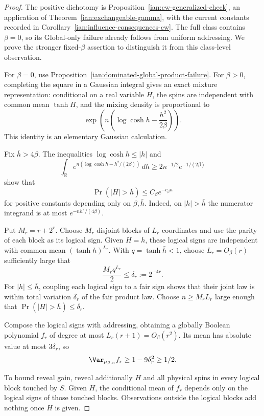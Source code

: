 \begin{proof}
The positive dichotomy is
Proposition~\ref{ian:cw-generalized-check}, an application of
Theorem~\ref{ian:exchangeable-gamma}, with the current constants
recorded in Corollary~\ref{ian:influence-consequences-cw}.
The full class contains \(\beta=0\), so its Global-only failure
already follows from uniform addressing. We prove the stronger
fixed-\(\beta\) assertion to distinguish it from this class-level
observation.

For \(\beta=0\), use
Proposition~\ref{ian:dominated-global-product-failure}.
For \(\beta>0\), completing the square in a Gaussian integral gives
an exact mixture representation: conditional on a real variable
\(H\), the spins are independent with common mean \(\tanh H\), and
the mixing density is proportional to
\[
 \exp\left(n\left(\log\cosh h-\frac{h^2}{2\beta}\right)\right).
\]
This identity is an elementary Gaussian calculation.

Fix \(\bar h>4\beta\). The inequalities
\(\log\cosh h\le|h|\) and
\[
 \int_{\mathbb R}
 e^{n(\log\cosh h-h^2/(2\beta))}\,dh
 \ge2n^{-1/2}e^{-1/(2\beta)}
\]
show that
\[
 \Pr(|H|>\bar h)\le C_\beta e^{-c_\beta n}
\]
for positive constants depending only on \(\beta,\bar h\).
Indeed, on \(|h|>\bar h\) the numerator integrand is at most
\(e^{-nh^2/(4\beta)}\).

Put \(M_r=r+2^r\). Choose \(M_r\) disjoint blocks of \(L_r\)
coordinates and use the parity of each block as its logical sign.
Given \(H=h\), these logical signs are independent with common
mean \((\tanh h)^{L_r}\). With \(q=\tanh\bar h<1\), choose
\(L_r=O_\beta(r)\) sufficiently large that
\[
 \frac{M_rq^{L_r}}2\le\delta_r:=2^{-4r}.
\]
For \(|h|\le\bar h\), coupling each logical sign to a fair sign shows
that their joint law is within total variation \(\delta_r\) of
the fair product law. Choose \(n\ge M_rL_r\) large enough that
\(\Pr(|H|>\bar h)\le\delta_r\).

Compose the logical signs with addressing, obtaining a globally
Boolean polynomial \(f_r\) of degree at most \(L_r(r+1)=O_\beta(r^2)\).
Its mean has absolute value at most \(3\delta_r\), so
\[
 \Var_{\mu_{\beta,n}}f_r\ge1-9\delta_r^2\ge1/2.
\]

To bound reveal gain, reveal additionally \(H\) and all physical
spins in every logical block touched by \(S\).
Given \(H\), the conditional mean of \(f_r\) depends only on the
logical signs of those touched blocks. Observations outside the
logical blocks add nothing once \(H\) is given.


\end{proof}
